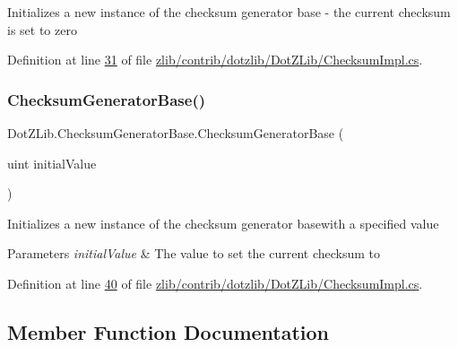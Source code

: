 Initializes a new instance of the checksum generator base -\/ the current checksum is set to zero 



Definition at line \hyperlink{zlib_2contrib_2dotzlib_2_dot_z_lib_2_checksum_impl_8cs_source_l00031}{31} of file \hyperlink{zlib_2contrib_2dotzlib_2_dot_z_lib_2_checksum_impl_8cs_source}{zlib/contrib/dotzlib/\+Dot\+Z\+Lib/\+Checksum\+Impl.\+cs}.

\mbox{\label{class_dot_z_lib_1_1_checksum_generator_base_ab36da84d395361311a45e88797ae8c69}} 
\subsubsection{\texorpdfstring{Checksum\+Generator\+Base()}{ChecksumGeneratorBase()}\hspace{0.1cm}{\footnotesize\ttfamily [4/4]}}
{\footnotesize\ttfamily Dot\+Z\+Lib.\+Checksum\+Generator\+Base.\+Checksum\+Generator\+Base (\begin{DoxyParamCaption}\item[{uint}]{initial\+Value }\end{DoxyParamCaption})\hspace{0.3cm}{\ttfamily [inline]}}



Initializes a new instance of the checksum generator basewith a specified value 


\begin{DoxyParams}{Parameters}
{\em initial\+Value} & The value to set the current checksum to\\
\hline
\end{DoxyParams}


Definition at line \hyperlink{zlib_2contrib_2dotzlib_2_dot_z_lib_2_checksum_impl_8cs_source_l00040}{40} of file \hyperlink{zlib_2contrib_2dotzlib_2_dot_z_lib_2_checksum_impl_8cs_source}{zlib/contrib/dotzlib/\+Dot\+Z\+Lib/\+Checksum\+Impl.\+cs}.



\subsection{Member Function Documentation}
\mbox{\label{class_dot_z_lib_1_1_checksum_generator_base_a78ec9de09223c6f9f81e4a32d8d00b70}} 
